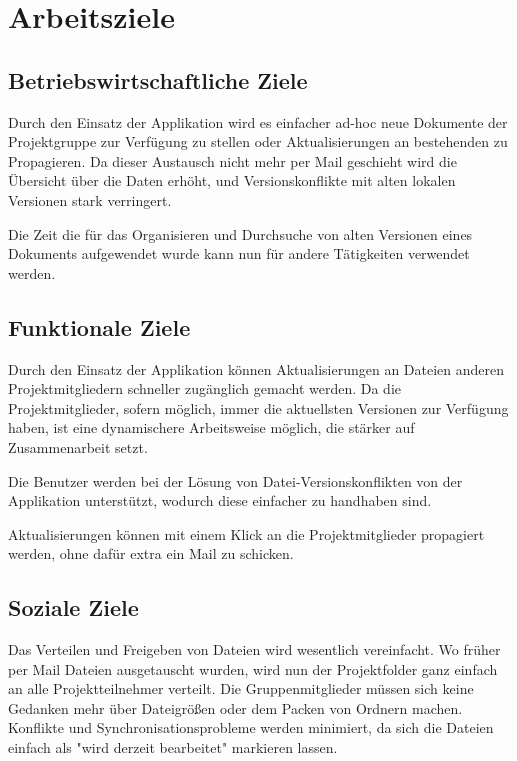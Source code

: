 
\section{Arbeitsziele}

\subsection{Betriebswirtschaftliche Ziele}

Durch den Einsatz der Applikation wird es einfacher ad-hoc neue Dokumente der Projektgruppe zur Verfügung zu stellen oder Aktualisierungen an bestehenden zu Propagieren. Da dieser Austausch nicht mehr per Mail geschieht wird die Übersicht über die Daten erhöht, und Versionskonflikte mit alten lokalen Versionen stark verringert.

Die Zeit die für das Organisieren und Durchsuche von alten Versionen eines Dokuments aufgewendet wurde kann nun für andere Tätigkeiten verwendet werden.

\subsection{Funktionale Ziele}

Durch den Einsatz der Applikation können Aktualisierungen an Dateien anderen Projektmitgliedern schneller zugänglich gemacht werden. Da die Projektmitglieder, sofern möglich, immer die aktuellsten Versionen zur Verfügung haben, ist eine dynamischere Arbeitsweise möglich, die stärker auf Zusammenarbeit setzt.

Die Benutzer werden bei der Lösung von Datei-Versionskonflikten von der Applikation unterstützt, wodurch diese einfacher zu handhaben sind.


Aktualisierungen können mit einem Klick an die Projektmitglieder propagiert werden, ohne dafür extra ein Mail zu schicken.

\subsection{Soziale Ziele}
Das Verteilen und Freigeben von Dateien wird wesentlich vereinfacht. Wo früher per Mail Dateien ausgetauscht wurden, wird nun der Projektfolder ganz einfach an alle Projektteilnehmer verteilt. Die Gruppenmitglieder müssen sich keine Gedanken mehr über Dateigrößen oder dem Packen von Ordnern machen. Konflikte und Synchronisationsprobleme werden minimiert, da sich die Dateien einfach als "wird derzeit bearbeitet" markieren lassen.

